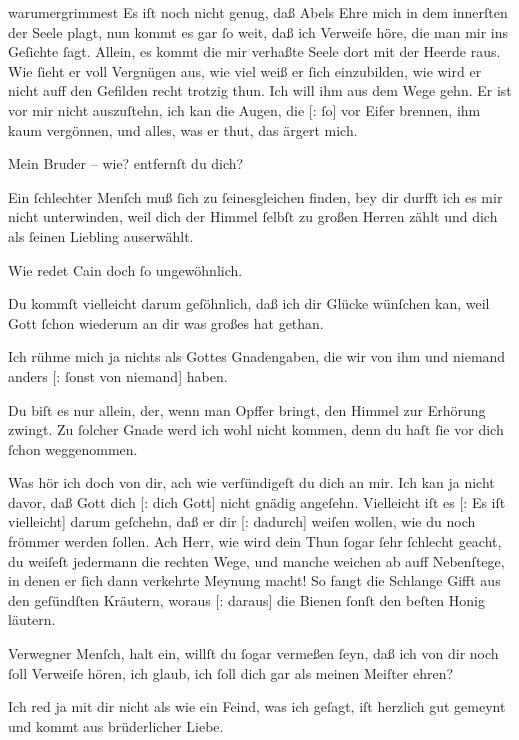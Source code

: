 \documentclass[tocstyle=ref-genre]{ees}
\begin{document}
{\begin{movement}{warumergrimmest}
  \voice[Cain]
  Es iſt noch nicht genug, daß Abels Ehre
  mich in dem innerſten der Seele plagt,
  nun kommt es gar ſo weit, daß ich Verweiſe höre,
  die man mir ins Geſichte ſagt.
  Allein, es kommt die mir verhaßte Seele
  dort mit der Heerde raus.
  Wie ſieht er voll Vergnügen aus,
  wie viel weiß er ſich einzubilden,
  wie wird er nicht auff den Gefilden
  recht trotzig thun. Ich will ihm aus dem Wege gehn.
  Er ist vor mir nicht auszuſtehn,
  ich kan die Augen, die [: ſo] vor Eifer brennen,
  ihm kaum vergönnen,
  und alles, was er thut, das ärgert mich.

  \voice[Abel]
  Mein Bruder – wie? entfernſt du dich?

  \voice[Cain]
  Ein ſchlechter Menſch muß ſich zu ſeinesgleichen finden,
  bey dir durfft ich es mir nicht unterwinden,
  weil dich der Himmel ſelbſt zu großen Herren zählt
  und dich als ſeinen Liebling auserwählt.

  \voice[Abel]
  Wie redet Cain doch ſo ungewöhnlich.

  \voice[Cain]
  Du kommſt vielleicht darum geſöhnlich,
  daß ich dir Glücke wünſchen kan,
  weil Gott ſchon wiederum an dir
  was großes hat gethan.

  \voice[Abel]
  Ich rühme mich ja nichts als Gottes Gnadengaben,
  die wir von ihm und niemand anders [: ſonst von niemand] haben.

  \voice[Cain]
  Du biſt es nur allein, der, wenn man Opffer bringt,
  den Himmel zur Erhörung zwingt.
  Zu ſolcher Gnade werd ich wohl nicht kommen,
  denn du haſt ſie vor dich ſchon weggenommen.

  \voice[Abel]
  Was hör ich doch von dir,
  ach wie verſündigeſt du dich an mir.
  Ich kan ja nicht davor,
  daß Gott dich [: dich Gott] nicht gnädig angeſehn.
  Vielleicht iſt es [: Es iſt vielleicht] darum geſchehn,
  daß er dir [: dadurch] weiſen wollen,
  wie du noch frömmer werden ſollen.
  Ach Herr, wie wird dein Thun ſogar ſehr ſchlecht geacht,
  du weiſeſt jedermann die rechten Wege,
  und manche weichen ab auff Nebenſtege,
  in denen er ſich dann verkehrte Meynung macht!
  So fangt die Schlange Gifft aus den geſündſten Kräutern,
  woraus [: daraus] die Bienen ſonſt den beſten Honig läutern.

  \voice[Cain]
  Verwegner Menſch, halt ein,
  willſt du ſogar vermeßen ſeyn,
  daß ich von dir noch ſoll Verweiſe hören,
  ich glaub, ich ſoll dich gar als meinen Meiſter ehren?

  \voice[Abel]
  Ich red ja mit dir nicht als wie ein Feind,
  was ich geſagt, iſt herzlich gut gemeynt
  und kommt aus brüderlicher Liebe.


\end{movement}}
\end{document}
